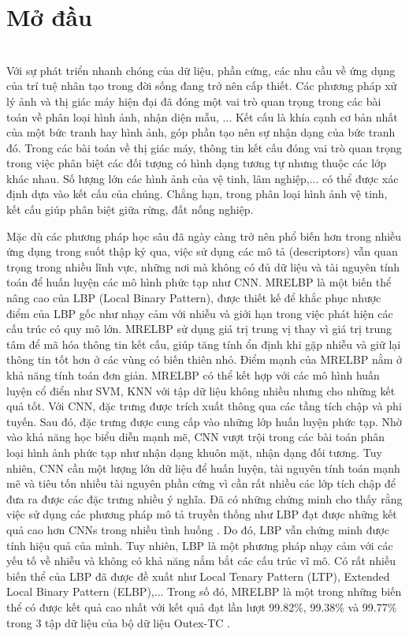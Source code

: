 \clearpage
{}

\chapter*{Mở đầu}
\vspace{0.3cm}
\\ Với sự phát triển nhanh chóng của dữ liệu, phần cứng, các nhu cầu về ứng dụng của trí tuệ nhân tạo trong đời sống đang trở nên cấp thiết. Các phương pháp xử lý ảnh và thị giác máy hiện đại đã đóng một vai trò quan trọng trong các bài toán về phân loại hình ảnh, nhận diện mẫu, ... Kết cấu là khía cạnh cơ bản nhất của một bức tranh hay hình ảnh, góp phần tạo nên sự nhận dạng của bức tranh đó. Trong các bài toán về thị giác máy, thông tin kết cấu đóng vai trò quan trọng trong việc phân biệt các đối tượng có hình dạng tương tự nhưng thuộc các lớp khác nhau. Số lượng lớn các hình ảnh của vệ tinh, lâm nghiệp,... có thể được xác định  dựa vào kết cấu của chúng. Chẳng hạn, trong phân loại hình ảnh vệ tinh, kết cấu giúp phân biệt giữa rừng, đất nống nghiệp. 


Mặc dù các phương pháp học sâu đã ngày càng trở nên phổ biến hơn trong nhiều ứng dụng trong suốt thập kỷ qua, việc sử dụng các mô tả (descriptors) vẫn quan trọng trong nhiều lĩnh vực, những nơi mà không có đủ dữ liệu và tài nguyên tính toán để huấn luyện các mô hình phức tạp như CNN. MRELBP là một biến thể nâng cao của LBP (Local Binary Pattern), được thiết kế để khắc phục nhược điểm của LBP gốc như nhạy cảm với nhiễu và giới hạn trong việc phát hiện các cấu trúc có quy mô lớn. MRELBP sử dụng giá trị trung vị thay vì giá trị trung tâm để mã hóa thông tin kết cấu, giúp tăng tính ổn định khi gặp nhiễu và giữ lại thông tin tốt hơn ở các vùng có biến thiên nhỏ. Điểm mạnh của MRELBP nằm ở khả năng tính toán đơn giản. MRELBP có thể kết hợp với các mô hình huấn luyện cổ điển như SVM, KNN với tập dữ liệu không nhiều nhưng cho những kết quả tốt. Với CNN, đặc trưng được trích xuất thông qua các tầng tích chập và phi tuyến. Sau đó, đặc trưng được cung cấp vào những lớp huấn luyện phức tạp. Nhờ vào khả năng học biểu diễn mạnh mẽ, CNN vượt trội trong các bài toán phân loại hình ảnh phức tạp như nhận dạng khuôn mặt, nhận dạng đối tương. Tuy nhiên, CNN cần một lượng lớn dữ liệu để huấn luyện, tài nguyên tính toán mạnh mẽ và tiêu tốn nhiều tài nguyên phần cứng vì cần rất nhiều các lớp tích chập để đưa ra được các đặc trưng nhiều ý nghĩa. Đã có những chứng minh cho thấy rằng việc sử dụng các phương pháp mô tả truyền thống như LBP đạt được những kết quả cao hơn CNNs trong nhiều tình huống \cite{Liu2017}. Do đó, LBP vẫn chứng minh được tính hiệu quả của mình. Tuy nhiên, LBP là một phương pháp nhạy cảm với các yếu tố về nhiễu và không có khả năng nắm bắt các cấu trúc vĩ mô. Có rất nhiều biến thể của LBP đã được đề xuất như Local Tenary Pattern (LTP), Extended Local Binary Pattern (ELBP),... Trong số đó, MRELBP là một trong những biến thể có được kết quả cao nhất với kết quả đạt lần lượt 99.82\%, 99.38\% và 99.77\% trong 3 tập dữ liệu của bộ dữ liệu Outex-TC \cite{Liu2016}.   


